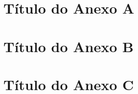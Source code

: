 \documentclass[
  12pt,		%
  a4paper,	%
  openright,%
  oneside,	%
  chapter=TITLE,		%
  section=TITLE,		%
  english,	%
  french,	%
  spanish,	%
  brazil
]{abntex2}
\begin{document}
    
    \begin{anexosenv}
    
        \chapter{Título do Anexo A}
            \lipsum[30]
      
        \chapter{Título do Anexo B}
            \lipsum[31]
        
        \chapter{Título do Anexo C}
            \lipsum[32]
      
    \end{anexosenv}
    
\end{document}
